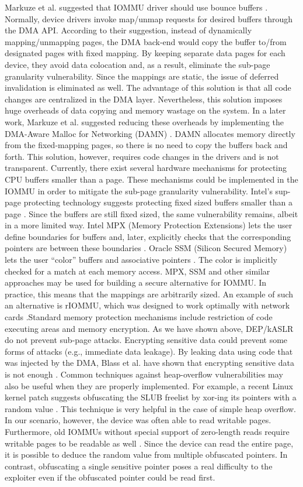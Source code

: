 Markuze et al. suggested that IOMMU driver should use bounce buffers \cite{MMT16}. Normally, device drivers invoke map/unmap requests for desired buffers through the DMA API. According to their suggestion, instead of dynamically mapping/unmapping pages, the DMA back-end would copy the buffer to/from designated pages with fixed mapping. By keeping separate data pages for each device, they avoid data colocation and, as a result, eliminate the sub-page granularity vulnerability. Since the mappings are static, the issue of deferred invalidation is eliminated as well. The advantage of this solution is that all code changes are centralized in the DMA layer. Nevertheless, this solution imposes huge overheads of data copying and memory wastage on the system. In a later work, Markuze et al. suggested reducing these overheads by implementing the DMA-Aware Malloc for Networking (DAMN) \cite{MSMT18}. DAMN allocates memory directly from the fixed-mapping pages, so there is no need to copy the buffers back and forth. This solution, however, requires code changes in the drivers and is not transparent.
Currently, there exist several hardware mechanisms for protecting CPU buffers smaller than a page. These mechanisms could be implemented in the IOMMU in order to mitigate the sub-page granularity vulnerability. Intel’s sup-page protecting technology suggests protecting fixed sized buffers smaller than a page \cite{Int18}. Since the buffers are still fixed sized, the same vulnerability remains, albeit in a more limited way. Intel MPX (Memory Protection Extensions) lets the user define boundaries for buffers and, later, explicitly checks that the corresponding pointers are between these boundaries \cite{Int16a}. Oracle SSM (Silicon Secured Memory) lets the user “color” buffers and associative pointers \cite{Ora15}. The color is implicitly checked for a match at each memory access. MPX, SSM and other similar approaches may be used for building a secure alternative for IOMMU. In practice, this means that the mappings are arbitrarily sized. An example of such an alternative is rIOMMU, which was designed to work optimally with network cards \cite{MABYT15}.Standard memory protection mechanisms include restriction of code executing areas and memory encryption. As we have shown above, DEP/kASLR do not prevent sub-page attacks. Encrypting sensitive data could prevent some forms of attacks (e.g., immediate data leakage). By leaking data using code that was injected by the DMA, Blass et al. have shown that encrypting sensitive data is not enough \cite{BR12}.
Common techniques against heap-overflow vulnerabilities may also be useful when they are properly implemented. For example, a recent Linux kernel patch suggests obfuscating the SLUB freelist by xor-ing its pointers with a random value \cite{Coo17}. This technique is very helpful in the case of simple heap overflow. In our scenario, however, the device was often able to read writable pages. Furthermore, old IOMMUs without special support of zero-length reads require writable pages to be readable as well \cite{Int16b}. Since the device can read the entire page, it is possible to deduce the random value from multiple obfuscated pointers. In contrast, obfuscating a single sensitive pointer poses a real difficulty to the exploiter even if the obfuscated pointer could be read first.
